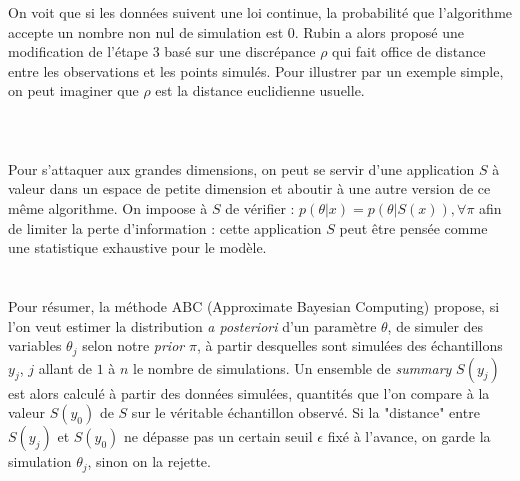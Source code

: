 \documentclass{article}
\theoremstyle{definition}
\begin{document}
On voit que si les données suivent une loi continue, la probabilité que l'algorithme accepte un nombre non nul de simulation est $0$. Rubin a alors proposé une modification de l'étape 3 basé sur une discrépance $\rho$ qui fait office de distance entre les observations et les points simulés. Pour illustrer par un exemple simple, on peut imaginer que $\rho$ est la distance euclidienne usuelle.\\
\\

\\
\\

Pour s'attaquer aux grandes dimensions, on peut se servir d'une application $S$ à valeur dans un espace de petite dimension et aboutir à une autre version de ce même algorithme. On impoose à $S$ de vérifier : $p(\theta|x)=p(\theta|S(x)),\forall \pi$ afin de limiter la perte d'information : cette application $S$ peut être pensée comme une statistique exhaustive pour le modèle.
\\

\\
\\

Pour résumer, la méthode ABC (Approximate Bayesian Computing) propose, si l'on veut estimer la distribution \textit{a posteriori} d'un paramètre $\theta$, de simuler des variables $\theta_j$ selon notre \textit{prior} $\pi$, à partir desquelles sont simulées des échantillons $y_j$, $j$ allant de $1$ à $n$ le nombre de simulations. Un ensemble de \textit{summary} $S(y_j)$ est alors calculé à partir des données simulées, quantités que l'on compare à la valeur $S(y_0)$ de $S$ sur le véritable échantillon observé. Si la "distance" entre $S(y_j)$ et $S(y_0)$ ne dépasse pas un certain seuil $\epsilon$ fixé à l'avance, on garde la simulation $\theta_j$, sinon on la rejette.  
\end{document}
